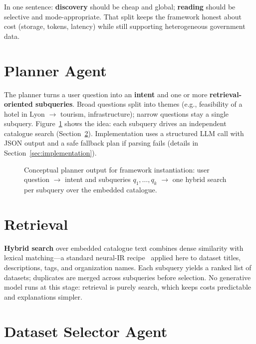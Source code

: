 \documentclass[sigconf,anonymous]{acmart}
\begin{document}
In one sentence: \textbf{discovery} should be cheap and global; \textbf{reading} should be selective and mode-appropriate. That split keeps the framework honest about cost (storage, tokens, latency) while still supporting heterogeneous government data.

\section{Planner Agent}
\label{sec:planner}

The planner turns a user question into an \textbf{intent} and one or more \textbf{retrieval-oriented subqueries}. Broad questions split into themes (e.g., feasibility of a hotel in Lyon $\rightarrow$ tourism, infrastructure); narrow questions stay a single subquery. Figure~\ref{fig:subqueries} shows the idea: each subquery drives an independent catalogue search (Section~\ref{sec:retrieval}). Implementation uses a structured LLM call with JSON output and a safe fallback plan if parsing fails (details in Section~\ref{sec:implementation}).

\begin{figure}[t]
  \centering
  \resizebox{0.92\columnwidth}{!}{}
  \caption{Conceptual planner output for framework instantiation: user question $\rightarrow$ intent and subqueries $q_1,\ldots,q_k$ $\rightarrow$ one hybrid search per subquery over the embedded catalogue.}
  \label{fig:subqueries}
\end{figure}

\section{Retrieval}
\label{sec:retrieval}

\textbf{Hybrid search} over embedded catalogue text combines dense similarity with lexical matching---a standard neural-IR recipe~\cite{lee2023hybrid, wang2024rag} applied here to dataset titles, descriptions, tags, and organization names. Each subquery yields a ranked list of datasets; duplicates are merged across subqueries before selection. No generative model runs at this stage: retrieval is purely search, which keeps costs predictable and explanations simpler.

\section{Dataset Selector Agent}
\label{sec:selector}
\end{document}
